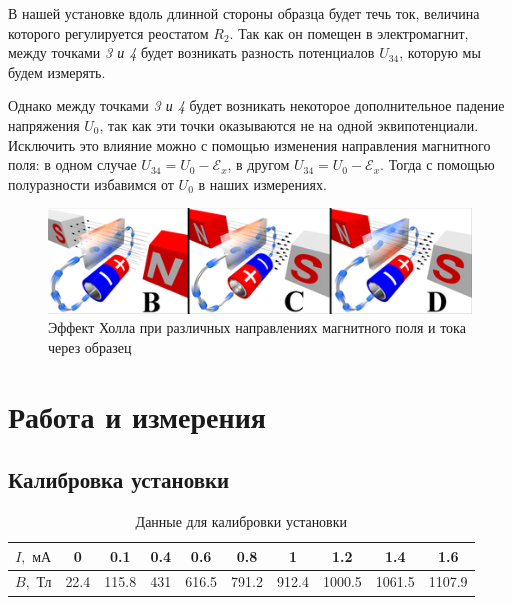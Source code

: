 \documentclass[a4paper, 12pt]{article}
\begin{document}
В нашей установке вдоль длинной стороны образца будет течь ток, величина которого регулируется реостатом $R_2$. Так как он помещен в электромагнит, между точками \textit{3 и 4} будет возникать разность потенциалов $U_{34}$, которую мы будем измерять. 

Однако между точками \textit{3 и 4} будет возникать некоторое дополнительное падение напряжения $U_{0}$, так как эти точки оказываются не на одной эквипотенциали. Исключить это влияние можно с помощью изменения направления магнитного поля: в одном случае $U_{34} = U_{0} - \mathscr{E}_x $, в другом  $U_{34} = U_0 - \mathscr{E}_x $. Тогда с помощью полуразности избавимся от $U_{0}$ в наших измерениях. 

\begin{figure}[H]
	\begin{center}
		\includegraphics[width = 0.6 \textwidth]{Hall_dif}
		\caption{Эффект Холла при различных направлениях магнитного поля и тока через образец}
	\end{center}
\end{figure}

\section{Работа и измерения}

\subsection*{Калибровка установки}

\begin{table}[H]
\centering
\begin{tabular}{|c|c|c|c|c|c|c|c|c|c|}
\hline
$I, \text{ мА}$ & 0    & 0.1   & 0.4 & 0.6   & 0.8   & 1     & 1.2    & 1.4    & 1.6    \\ \hline
$B, \text{ Тл}$ & 22.4 & 115.8 & 431 & 616.5 & 791.2 & 912.4 & 1000.5 & 1061.5 & 1107.9 \\ \hline
\end{tabular}
\caption{Данные для калибровки установки}
\end{table}
\end{document}
